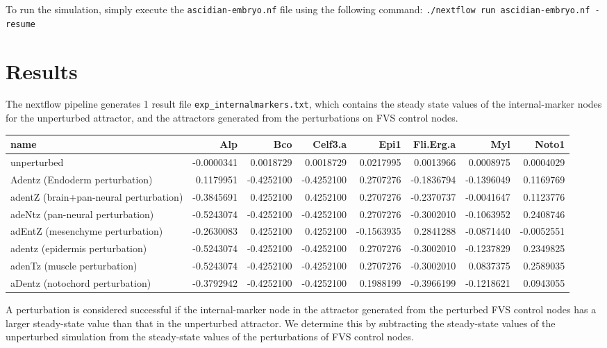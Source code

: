 \documentclass[
]{book}
\begin{document}
To run the simulation, simply execute the \texttt{ascidian-embryo.nf} file using the following command: \texttt{./nextflow\ run\ ascidian-embryo.nf\ -resume}

\hypertarget{results}{%
\section{Results}\label{results}}

The nextflow pipeline generates 1 result file \texttt{exp\_internalmarkers.txt}, which contains the steady state values of the internal-marker nodes for the unperturbed attractor, and the attractors generated from the perturbations on FVS control nodes.

\begin{table}
\centering\begingroup\fontsize{8}{10}\selectfont

\begin{tabular}{l|r|r|r|r|r|r|r}
\hline
name & Alp & Bco & Celf3.a & Epi1 & Fli.Erg.a & Myl & Noto1\\
\hline
unperturbed & -0.0000341 & 0.0018729 & 0.0018729 & 0.0217995 & 0.0013966 & 0.0008975 & 0.0004029\\
\hline
Adentz (Endoderm perturbation) & 0.1179951 & -0.4252100 & -0.4252100 & 0.2707276 & -0.1836794 & -0.1396049 & 0.1169769\\
\hline
adentZ (brain+pan-neural perturbation) & -0.3845691 & 0.4252100 & 0.4252100 & 0.2707276 & -0.2370737 & -0.0041647 & 0.1123776\\
\hline
adeNtz (pan-neural perturbation) & -0.5243074 & -0.4252100 & -0.4252100 & 0.2707276 & -0.3002010 & -0.1063952 & 0.2408746\\
\hline
adEntZ (mesenchyme perturbation) & -0.2630083 & 0.4252100 & 0.4252100 & -0.1563935 & 0.2841288 & -0.0871440 & -0.0052551\\
\hline
adentz (epidermis perturbation) & -0.5243074 & -0.4252100 & -0.4252100 & 0.2707276 & -0.3002010 & -0.1237829 & 0.2349825\\
\hline
adenTz (muscle perturbation) & -0.5243074 & -0.4252100 & -0.4252100 & 0.2707276 & -0.3002010 & 0.0837375 & 0.2589035\\
\hline
aDentz (notochord perturbation) & -0.3792942 & -0.4252100 & -0.4252100 & 0.1988199 & -0.3966199 & -0.1218621 & 0.0943055\\
\hline
\end{tabular}
\endgroup{}
\end{table}

A perturbation is considered successful if the internal-marker node in the attractor generated from the perturbed FVS control nodes has a larger steady-state value than that in the unperturbed attractor. We determine this by subtracting the steady-state values of the unperturbed simulation from the steady-state values of the perturbations of FVS control nodes.
\end{document}

